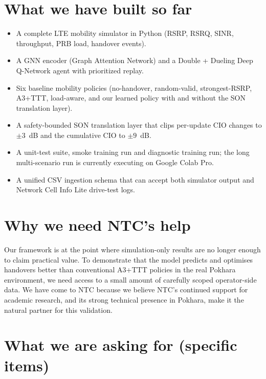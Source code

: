 \documentclass[11pt,a4paper]{article}
\begin{document}
\section{What we have built so far}

\begin{itemize}[leftmargin=*]
    \item A complete LTE mobility simulator in Python (RSRP, RSRQ, SINR,
    throughput, PRB load, handover events).
    \item A GNN encoder (Graph Attention Network) and a Double + Dueling
    Deep Q-Network agent with prioritized replay.
    \item Six baseline mobility policies (no-handover, random-valid,
    strongest-RSRP, A3+TTT, load-aware, and our learned policy with and
    without the SON translation layer).
    \item A safety-bounded SON translation layer that clips per-update
    CIO changes to $\pm 3$~dB and the cumulative CIO to $\pm 9$~dB.
    \item A unit-test suite, smoke training run and diagnostic training
    run; the long multi-scenario run is currently executing on Google
    Colab Pro.
    \item A unified CSV ingestion schema that can accept both
    simulator output and Network Cell Info Lite drive-test logs.
\end{itemize}

\section{Why we need NTC's help}

Our framework is at the point where simulation-only results are no
longer enough to claim practical value. To demonstrate that the model
predicts and optimises handovers better than conventional A3+TTT
policies in the real Pokhara environment, we need access to a small
amount of carefully scoped operator-side data. We have come to NTC
because we believe NTC's continued support for academic research, and
its strong technical presence in Pokhara, make it the natural partner
for this validation.

\section{What we are asking for (specific items)}
\end{document}
